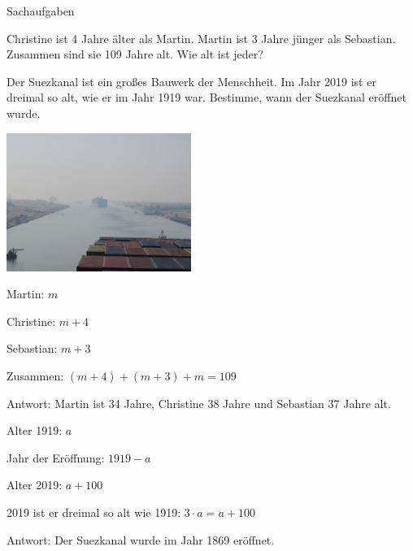 \documentclass[12pt,a5paper,landscape]{scrartcl}
\begin{document}
\begin{karte1}{Sachaufgaben}
	\begin{enumeratea}
		\item Christine ist 4 Jahre älter als Martin. Martin ist 3 Jahre jünger als Sebastian. Zusammen sind sie 109 Jahre alt. Wie alt ist jeder?
		\item Der Suezkanal ist ein großes Bauwerk der Menschheit. Im Jahr 2019 ist er dreimal so alt, wie er im Jahr 1919 war. Bestimme, wann der Suezkanal eröffnet wurde.
	\end{enumeratea}
	
	\begin{center}
		\includegraphics[width=6cm]{7.4-LT-Abb_Suezkanal_by_pass}
	\end{center}
	
\end{karte1}

\begin{loesungskarte}
	\begin{enumeratea}
		\item 
		\begin{smallitemize}
			\item Martin: $m$
			\item Christine: $m+4$
			\item Sebastian: $m+3$
			\item Zusammen: $(m+4) + (m+3) + m = 109$
		\end{smallitemize}
		
		Antwort: Martin ist 34 Jahre, Christine 38 Jahre und Sebastian 37 Jahre alt.
		
		\item
		\begin{smallitemize}
			\item Alter 1919: $a$
			\item Jahr der Eröffnung: $1919-a$
			\item Alter 2019: $a+100$
			\item 2019 ist er dreimal so alt wie 1919: $3\cdot a = a+100$
		\end{smallitemize}
		
		Antwort: Der Suezkanal wurde im Jahr 1869 eröffnet.
	\end{enumeratea}
\end{loesungskarte}
\end{document}

